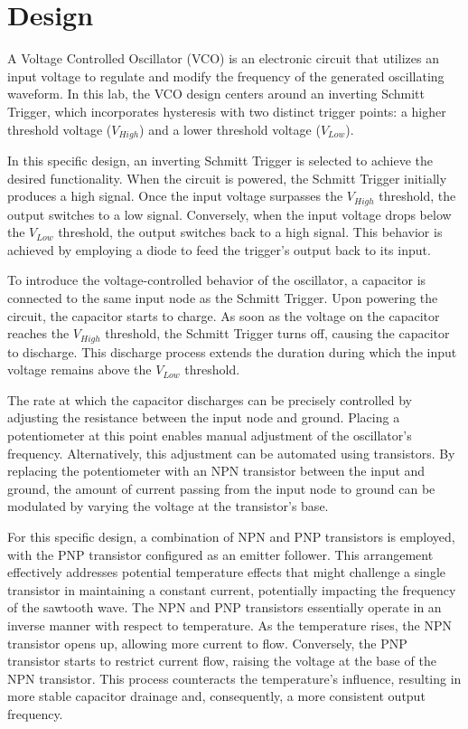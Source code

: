 \documentclass{article}
\begin{document}
\section*{\textcolor{mycolor}{Design}}
A Voltage Controlled Oscillator (VCO) is an electronic circuit that utilizes an input voltage to regulate and modify the frequency of the generated oscillating waveform. In this lab, the VCO design centers around an inverting Schmitt Trigger, which incorporates hysteresis with two distinct trigger points: a higher threshold voltage ($V_{High}$) and a lower threshold voltage ($V_{Low}$).

In this specific design, an inverting Schmitt Trigger is selected to achieve the desired functionality. When the circuit is powered, the Schmitt Trigger initially produces a high signal. Once the input voltage surpasses the $V_{High}$ threshold, the output switches to a low signal. Conversely, when the input voltage drops below the $V_{Low}$ threshold, the output switches back to a high signal. This behavior is achieved by employing a diode to feed the trigger's output back to its input.

To introduce the voltage-controlled behavior of the oscillator, a capacitor is connected to the same input node as the Schmitt Trigger. Upon powering the circuit, the capacitor starts to charge. As soon as the voltage on the capacitor reaches the $V_{High}$ threshold, the Schmitt Trigger turns off, causing the capacitor to discharge. This discharge process extends the duration during which the input voltage remains above the $V_{Low}$ threshold.

The rate at which the capacitor discharges can be precisely controlled by adjusting the resistance between the input node and ground. Placing a potentiometer at this point enables manual adjustment of the oscillator's frequency. Alternatively, this adjustment can be automated using transistors. By replacing the potentiometer with an NPN transistor between the input and ground, the amount of current passing from the input node to ground can be modulated by varying the voltage at the transistor's base.

For this specific design, a combination of NPN and PNP transistors is employed, with the PNP transistor configured as an emitter follower. This arrangement effectively addresses potential temperature effects that might challenge a single transistor in maintaining a constant current, potentially impacting the frequency of the sawtooth wave. The NPN and PNP transistors essentially operate in an inverse manner with respect to temperature. As the temperature rises, the NPN transistor opens up, allowing more current to flow. Conversely, the PNP transistor starts to restrict current flow, raising the voltage at the base of the NPN transistor. This process counteracts the temperature's influence, resulting in more stable capacitor drainage and, consequently, a more consistent output frequency.
\end{document}
